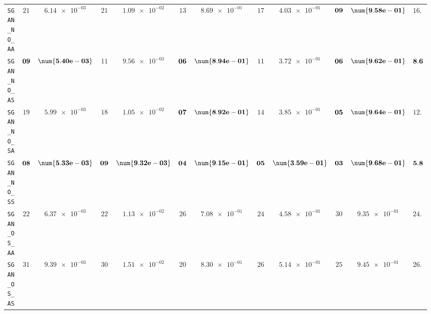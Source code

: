 \begin{xltabular}{\textwidth}{l||cC|cC|cC|cC|cC||c}
	\texttt{SGAN\_NO\_AA} & $ 21$ & $ \num{6.14e-03}$ & $ 21$ & $ \num{1.09e-02}$ & $ 13$ & $ \num{8.69e-01}$ & $ 17$ & $ \num{4.03e-01}$ & $\bf 09$ & $\bf \num{9.58e-01}$ & $ 16.2$  \\
	\texttt{SGAN\_NO\_AS} & $\bf 09$ & $\bf \num{5.40e-03}$ & $ 11$ & $ \num{9.56e-03}$ & $\bf 06$ & $\bf \num{8.94e-01}$ & $ 11$ & $ \num{3.72e-01}$ & $\bf 06$ & $\bf \num{9.62e-01}$ & $\bf 8.6$  \\
	\texttt{SGAN\_NO\_SA} & $ 19$ & $ \num{5.99e-03}$ & $ 18$ & $ \num{1.05e-02}$ & $\bf 07$ & $\bf \num{8.92e-01}$ & $ 14$ & $ \num{3.85e-01}$ & $\bf 05$ & $\bf \num{9.64e-01}$ & $ 12.6$  \\
	\texttt{SGAN\_NO\_SS} & $\bf 08$ & $\bf \num{5.33e-03}$ & $\bf 09$ & $\bf \num{9.32e-03}$ & $\bf 04$ & $\bf \num{9.15e-01}$ & $\bf 05$ & $\bf \num{3.59e-01}$ & $\bf 03$ & $\bf \num{9.68e-01}$ & $\bf 5.8$  \\
	\texttt{SGAN\_OS\_AA} & $ 22$ & $ \num{6.37e-03}$ & $ 22$ & $ \num{1.13e-02}$ & $ 26$ & $ \num{7.08e-01}$ & $ 24$ & $ \num{4.58e-01}$ & $ 30$ & $ \num{9.35e-01}$ & $ 24.8$  \\
	\texttt{SGAN\_OS\_AS} & $ 31$ & $ \num{9.39e-03}$ & $ 30$ & $ \num{1.51e-02}$ & $ 20$ & $ \num{8.30e-01}$ & $ 26$ & $ \num{5.14e-01}$ & $ 25$ & $ \num{9.45e-01}$ & $ 26.4$  \\

\end{xltabular}
